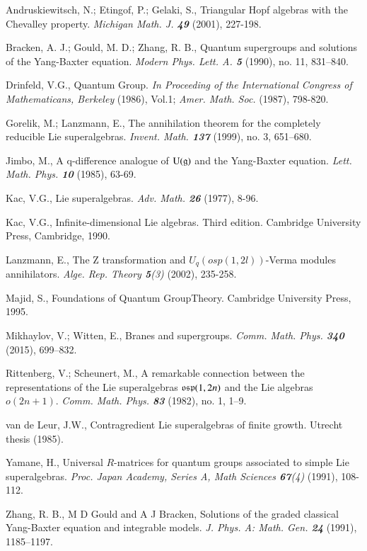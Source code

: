 \documentclass[12pt]{amsart}
\theoremstyle{definition}
\theoremstyle{remark}
\numberwithin{equation}{section}
\begin{document}
\begin{thebibliography}{9999}

 Andruskiewitsch, N.; Etingof, P.; Gelaki, S., Triangular Hopf algebras with the Chevalley property. {\sl Michigan Math. J. \bf 49} (2001), 227-198.

  Bracken, A. J.; Gould, M. D.; Zhang, R. B.,
Quantum supergroups and solutions of the Yang-Baxter equation.
{\sl Modern Phys. Lett. A. \bf 5} (1990), no. 11, 831--840.

 Drinfeld, V.G., Quantum Group. {\sl In Proceeding of the International Congress of Mathematicans, Berkeley} (1986), Vol.1; {\sl Amer. Math. Soc.} (1987), 798-820.

 Gorelik, M.; Lanzmann, E.,
The annihilation theorem for the completely reducible Lie superalgebras.
{\sl Invent. Math. \bf 137} (1999), no. 3, 651--680.

Jimbo, M., A q-difference analogue of ${{\rm U}} ({{\mathfrak g}})$ and the Yang-Baxter equation. {\sl Lett. Math. Phys. \bf 10} (1985), 63-69.

Kac, V.G., Lie superalgebras. {\sl  Adv. Math. \bf 26} (1977), 8-96.

Kac, V.G., Infinite-dimensional Lie algebras. Third edition. Cambridge University Press, Cambridge, 1990.

Lanzmann, E., The Z transformation and $U_q (osp (1, 2l))$-Verma modules annihilators.  {\sl Alge.  Rep. Theory  {\bf 5}(3)} (2002), 235-258.

 Majid, S., Foundations of Quantum GroupTheory.  Cambridge University Press, 1995.

  Mikhaylov, V.; Witten, E.,
 Branes and supergroups. {\sl Comm. Math. Phys. \bf 340} (2015), 699--832.

 Rittenberg, V.; Scheunert, M., A remarkable connection between the representations of the Lie superalgebras ${{\rm\mathfrak{osp}}}(1,2n)$ and the Lie algebras $o(2n+1)$. {\sl Comm. Math. Phys. \bf 83} (1982), no. 1, 1--9.

 van de Leur,  J.W., Contragredient Lie superalgebras of finite growth. Utrecht thesis (1985).

  Yamane, H., Universal $R$-matrices for quantum groups associated to simple Lie superalgebras. {\sl Proc. Japan Academy, Series A, Math Sciences  {\bf 67}(4)}  (1991), 108-112.

Zhang, R. B., M D Gould and A J Bracken,
Solutions of the graded classical Yang-Baxter equation and integrable models.
{\sl J. Phys. A: Math. Gen. \bf 24} (1991), 1185--1197.


\end{thebibliography}
\end{document}
